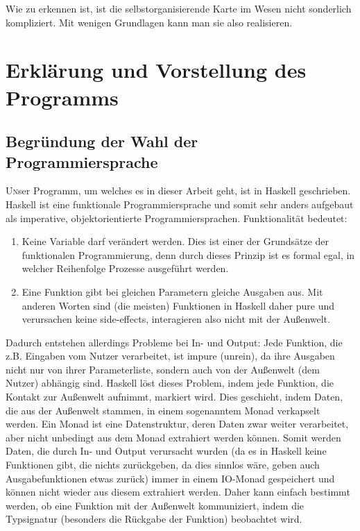 \documentclass[twoside,a4paper]{article}
\newcommand{\commonlettrine}[1]{\lettrine[nindent=0em,lines=2]{#1}}
\begin{document}
Wie zu erkennen ist, ist die selbstorganisierende Karte im Wesen nicht sonderlich kompliziert. Mit wenigen Grundlagen kann man sie also realisieren.

\section{Erklärung und Vorstellung des Programms}

\subsection{Begründung der Wahl der Programmiersprache}

\commonlettrine{U}nser Programm, um welches es in dieser Arbeit geht, ist in Haskell geschrieben. Haskell ist eine funktionale Programmiersprache und somit sehr anders aufgebaut als imperative, objektorientierte Programmiersprachen. Funktionalität bedeutet:

\begin{enumerate}
\item Keine Variable darf verändert werden. Dies ist einer der Grundsätze der funktionalen Programmierung, denn durch dieses Prinzip ist es formal egal, in welcher Reihenfolge Prozesse ausgeführt werden.

\item Eine Funktion gibt bei gleichen Parametern gleiche Ausgaben aus. Mit anderen Worten sind (die meisten) Funktionen in Haskell daher \glqq{}pure\grqq{} und verursachen keine \glqq{}side-effects\grqq{}, interagieren also nicht mit der Außenwelt.
\end{enumerate}

Dadurch entstehen allerdings Probleme bei In- und Output: Jede Funktion, die z.B. Eingaben vom Nutzer verarbeitet, ist \glqq{}impure\grqq{} (unrein), da ihre Ausgaben nicht nur von ihrer Parameterliste, sondern auch von der Außenwelt (dem Nutzer) abhängig sind. Haskell löst dieses Problem, indem jede Funktion, die Kontakt zur Außenwelt aufnimmt, markiert wird. Dies geschieht, indem Daten, die aus der Außenwelt stammen, in einem sogenanntem \glqq{}Monad\grqq{} verkapselt werden. Ein Monad ist eine Datenstruktur, deren Daten zwar weiter verarbeitet, aber nicht unbedingt aus dem Monad extrahiert werden können. Somit werden Daten, die durch In- und Output verursacht wurden (da es in Haskell keine Funktionen gibt, die nichts zurückgeben, da dies sinnlos wäre, geben auch Ausgabefunktionen etwas zurück) immer in einem \glqq{}IO-Monad\grqq{} gespeichert und können nicht wieder aus diesem extrahiert werden. Daher kann einfach bestimmt werden, ob eine Funktion mit der Außenwelt kommuniziert, indem die Typsignatur (besonders die Rückgabe der Funktion) beobachtet wird.
\end{document}
